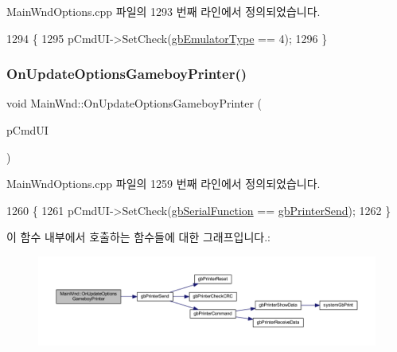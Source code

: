 Main\+Wnd\+Options.\+cpp 파일의 1293 번째 라인에서 정의되었습니다.


\begin{DoxyCode}
1294 \{
1295   pCmdUI->SetCheck(\mbox{\hyperlink{gb_globals_8cpp_aab449ed6ecf2bd502928a3d5aa5c54c4}{gbEmulatorType}} == 4);
1296 \}
\end{DoxyCode}
\mbox{\label{class_main_wnd_ab7257fc8414b9a73639c04106ecd1765}} 
\subsubsection{\texorpdfstring{On\+Update\+Options\+Gameboy\+Printer()}{OnUpdateOptionsGameboyPrinter()}}
{\footnotesize\ttfamily void Main\+Wnd\+::\+On\+Update\+Options\+Gameboy\+Printer (\begin{DoxyParamCaption}\item[{C\+Cmd\+UI $\ast$}]{p\+Cmd\+UI }\end{DoxyParamCaption})\hspace{0.3cm}{\ttfamily [protected]}}



Main\+Wnd\+Options.\+cpp 파일의 1259 번째 라인에서 정의되었습니다.


\begin{DoxyCode}
1260 \{
1261   pCmdUI->SetCheck(\mbox{\hyperlink{gb_globals_8cpp_a824d706a8d4285ee024bfd05a69e47e4}{gbSerialFunction}} == \mbox{\hyperlink{gb_printer_8cpp_ad92e246f72a463f50f3c0856418e087e}{gbPrinterSend}});
1262 \}
\end{DoxyCode}
이 함수 내부에서 호출하는 함수들에 대한 그래프입니다.\+:
\nopagebreak
\begin{figure}[H]
\begin{center}
\leavevmode
\includegraphics[width=350pt]{class_main_wnd_ab7257fc8414b9a73639c04106ecd1765_cgraph}
\end{center}
\end{figure}
\mbox{\label{class_main_wnd_ae6d09f6d944ff25a57bfef8b23c77c0c}} 
